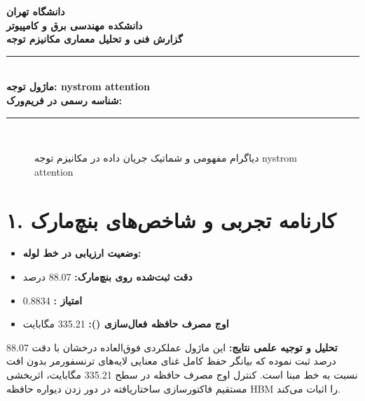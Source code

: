 \documentclass[12pt,a4paper]{article}
\begin{document}
\begin{center}
{\Large\bfseries دانشگاه تهران}\\[0.2cm]
{\large\bfseries دانشکده مهندسی برق و کامپیوتر}\\[0.2cm]
{\large\bfseries گزارش فنی و تحلیل معماری مکانیزم توجه}\\[0.5cm]
\rule{\linewidth}{1pt}\\[0.3cm]
{\LARGE\bfseries ماژول توجه: nystrom attention}\\[0.2cm]
{\large \textbf{شناسه رسمی در فریم‌ورک:} }\\[0.2cm]
\rule{\linewidth}{1pt}\\[0.5cm]
\end{center}

\begin{figure}[H]
\centering
{}
\caption{دیاگرام مفهومی و شماتیک جریان داده در مکانیزم توجه nystrom attention}
\end{figure}

\section*{۱. کارنامه تجربی و شاخص‌های بنچ‌مارک}
\begin{itemize}
\item \textbf{وضعیت ارزیابی در خط لوله:} 
\item \textbf{دقت ثبت‌شده روی بنچ‌مارک:} 88.07 درصد
\item \textbf{امتیاز :} 0.8834
\item \textbf{اوج مصرف حافظه فعال‌سازی ():} 335.21 مگابایت
\end{itemize}
\textbf{تحلیل و توجیه علمی نتایج:} این ماژول عملکردی فوق‌العاده درخشان با دقت 88.07 درصد ثبت نموده که بیانگر حفظ کامل غنای معنایی لایه‌های ترنسفورمر بدون افت نسبت به خط مبنا است. کنترل اوج مصرف حافظه در سطح 335.21 مگابایت، اثربخشی مستقیم فاکتورسازی ساختاریافته در دور زدن دیواره حافظه HBM را اثبات می‌کند.
\end{document}
